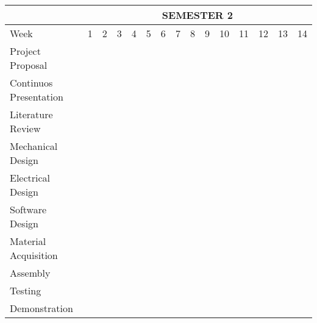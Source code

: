 \begin{table}[htb]
  \begin{center}
    \leavevmode
\begin{tabular}{|l|c|c|c|c|c|c|c|c|c|c|c|c|c|c|} \hline
& \multicolumn{14}{c|}{SEMESTER 2} \\ \hline
\rowcolor{white} Week & 1 & 2 & 3 & 4 & 5 & 6 & 7 & 8 & 9 & 10 & 11 & 12 & 13 & 14 \\ \hline
\rowcolor{white} Project Proposal & & & & & & & & & & & & & & \\ \hline
\rowcolor{white} Continuos Presentation & \cellcolor{yellow} & \cellcolor{yellow} & \cellcolor{yellow} & \cellcolor{yellow} & \cellcolor{yellow} & \cellcolor{yellow} & \cellcolor{yellow} & \cellcolor{yellow} & \cellcolor{yellow} & & & & & \\ \hline
\rowcolor{white} Literature Review & \cellcolor{yellow} & \cellcolor{yellow} & \cellcolor{yellow} & \cellcolor{yellow} & \cellcolor{yellow} & & & & & & & & & \\ \hline
\rowcolor{white} Mechanical Design & & & & & & & & & & & & & & \\ \hline
\rowcolor{white} Electrical Design & & & & & & & & & & & & & & \\ \hline
\rowcolor{white} Software Design & & & & & & & & & & & & & & \\ \hline
\rowcolor{white} Material Acquisition & \cellcolor{yellow} & \cellcolor{yellow} & & & & & & & & & & & & \\ \hline
\rowcolor{white} Assembly & \cellcolor{yellow} & \cellcolor{yellow} & \cellcolor{yellow} & \cellcolor{yellow} & & & & & & & & & & \\ \hline
\rowcolor{white} Testing & & & & \cellcolor{yellow} & \cellcolor{yellow} & \cellcolor{yellow} & \cellcolor{yellow} & \cellcolor{yellow} & \cellcolor{yellow} & \cellcolor{yellow} & & & & \\ \hline
\rowcolor{white} Demonstration & & & & & & & & & & \cellcolor{yellow} & \cellcolor{yellow} & \cellcolor{yellow} & \cellcolor{yellow} & \cellcolor{yellow} \\ \hline
\end{tabular}
\label{table:semester2timeplan}
\end{center}
\end{table}